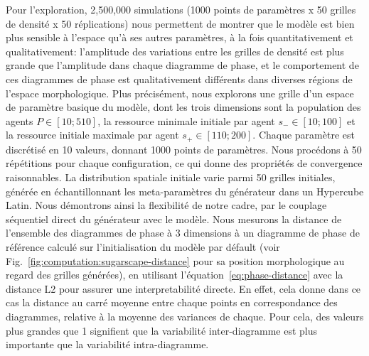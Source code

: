 {Pour l'exploration, 2,500,000 simulations (1000 points de paramètres x 50 grilles de densité x 50 réplications) nous permettent de montrer que le modèle est bien plus sensible à l'espace qu'à ses autres paramètres, à la fois quantitativement et qualitativement: l'amplitude des variations entre les grilles de densité est plus grande que l'amplitude dans chaque diagramme de phase, et le comportement de ces diagrammes de phase est qualitativement différents dans diverses régions de l'espace morphologique. Plus précisément, nous explorons une grille d'un espace de paramètre basique du modèle, dont les trois dimensions sont la population des agents $P\in \left[10;510\right]$, la ressource minimale initiale par agent $s_{-}\in \left[10;100\right]$ et la ressource initiale maximale par agent $s_{+}\in \left[110;200\right]$. Chaque paramètre est discrétisé en 10 valeurs, donnant 1000 points de paramètres. Nous procédons à 50 répétitions pour chaque configuration, ce qui donne des propriétés de convergence raisonnables. La distribution spatiale initiale varie parmi 50 grilles initiales, générée en échantillonnant les meta-paramètres du générateur dans un Hypercube Latin. Nous démontrons ainsi la flexibilité de notre cadre, par le couplage séquentiel direct du générateur avec le modèle. Nous mesurons la distance de l'ensemble des diagrammes de phase à 3 dimensions à un diagramme de phase de référence calculé sur l'initialisation du modèle par défault (voir Fig.~\ref{fig:computation:sugarscape-distance} pour sa position morphologique au regard des grilles générées), en utilisant l'équation~\ref{eq:phase-distance} avec la distance L2 pour assurer une interpretabilité directe. En effet, cela donne dans ce cas la distance au carré moyenne entre chaque points en correspondance des diagrammes, relative à la moyenne des variances de chaque. Pour cela, des valeurs plus grandes que 1 signifient que la variabilité inter-diagramme est plus importante que la variabilité intra-diagramme.
}



